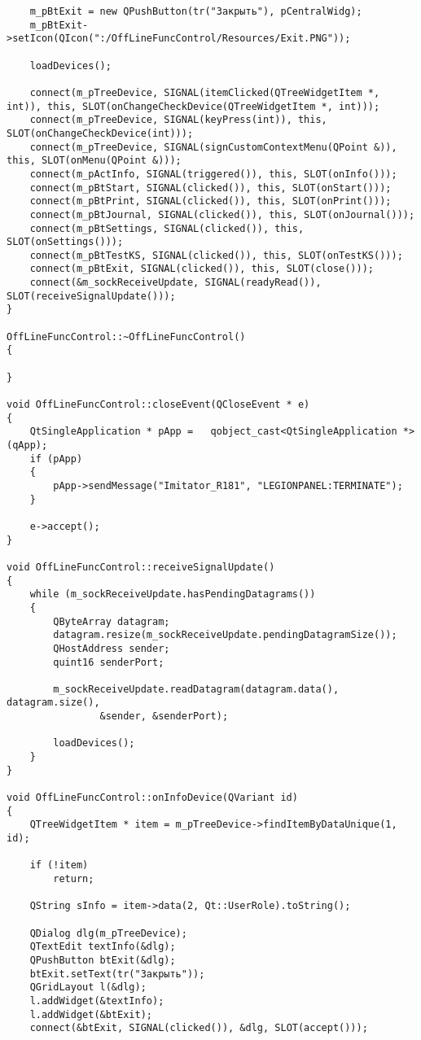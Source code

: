\begin{verbatim}
	m_pBtExit = new QPushButton(tr("Закрыть"), pCentralWidg);
	m_pBtExit->setIcon(QIcon(":/OffLineFuncControl/Resources/Exit.PNG"));

	loadDevices();

	connect(m_pTreeDevice, SIGNAL(itemClicked(QTreeWidgetItem *, int)), this, SLOT(onChangeCheckDevice(QTreeWidgetItem *, int)));
	connect(m_pTreeDevice, SIGNAL(keyPress(int)), this, SLOT(onChangeCheckDevice(int)));
	connect(m_pTreeDevice, SIGNAL(signCustomContextMenu(QPoint &)), this, SLOT(onMenu(QPoint &)));
	connect(m_pActInfo, SIGNAL(triggered()), this, SLOT(onInfo()));
	connect(m_pBtStart, SIGNAL(clicked()), this, SLOT(onStart()));
	connect(m_pBtPrint, SIGNAL(clicked()), this, SLOT(onPrint()));
	connect(m_pBtJournal, SIGNAL(clicked()), this, SLOT(onJournal()));
	connect(m_pBtSettings, SIGNAL(clicked()), this, SLOT(onSettings()));
	connect(m_pBtTestKS, SIGNAL(clicked()), this, SLOT(onTestKS()));
	connect(m_pBtExit, SIGNAL(clicked()), this, SLOT(close()));
	connect(&m_sockReceiveUpdate, SIGNAL(readyRead()), SLOT(receiveSignalUpdate()));
}

OffLineFuncControl::~OffLineFuncControl()
{

}

void OffLineFuncControl::closeEvent(QCloseEvent * e)
{
	QtSingleApplication * pApp =   qobject_cast<QtSingleApplication *>(qApp);
	if (pApp)
	{
		pApp->sendMessage("Imitator_R181", "LEGIONPANEL:TERMINATE");
	}

	e->accept();
}

void OffLineFuncControl::receiveSignalUpdate()
{
	while (m_sockReceiveUpdate.hasPendingDatagrams())
	{
		QByteArray datagram;
		datagram.resize(m_sockReceiveUpdate.pendingDatagramSize());
		QHostAddress sender;
		quint16 senderPort;

		m_sockReceiveUpdate.readDatagram(datagram.data(), datagram.size(),
				&sender, &senderPort);

		loadDevices();
	}
}

void OffLineFuncControl::onInfoDevice(QVariant id)
{
	QTreeWidgetItem * item = m_pTreeDevice->findItemByDataUnique(1, id);

	if (!item)
		return;

	QString sInfo = item->data(2, Qt::UserRole).toString();

	QDialog dlg(m_pTreeDevice);
	QTextEdit textInfo(&dlg);
	QPushButton btExit(&dlg);
	btExit.setText(tr("Закрыть"));
	QGridLayout l(&dlg);
	l.addWidget(&textInfo);
	l.addWidget(&btExit);
	connect(&btExit, SIGNAL(clicked()), &dlg, SLOT(accept()));


\end{verbatim}
